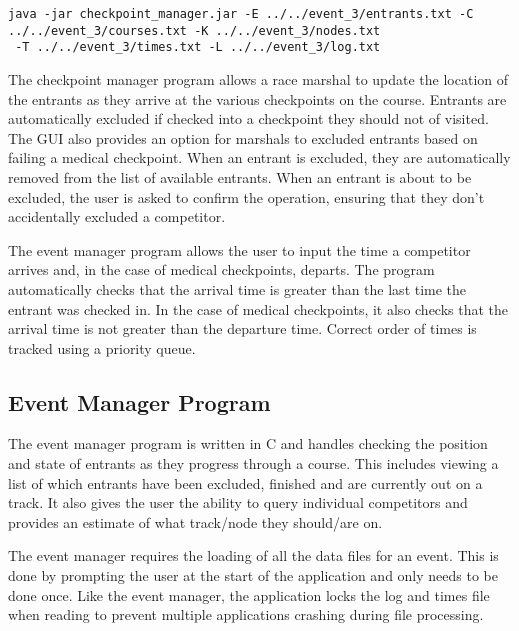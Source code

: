 \documentclass{article}
\begin{document}

\begin{center}
	\begin{lstlisting}[showstringspaces=false]
java -jar checkpoint_manager.jar -E ../../event_3/entrants.txt -C ../../event_3/courses.txt -K ../../event_3/nodes.txt
 -T ../../event_3/times.txt -L ../../event_3/log.txt

	\end{lstlisting}
\end{center}

The checkpoint manager program allows a race marshal to update the location of the entrants as they arrive at the various checkpoints on the course. Entrants are automatically excluded if checked into a checkpoint they should not of visited. The GUI also provides an option for marshals to excluded entrants based on failing a medical checkpoint. When an entrant is excluded, they are automatically removed from the list of available entrants. When an entrant is about to be excluded, the user is asked to confirm the operation, ensuring that they don't accidentally excluded a competitor.


The event manager program allows the user to input the time a competitor arrives and, in the case of medical checkpoints, departs. The program automatically checks that the arrival time is greater than the last time the entrant was checked in. In the case of medical checkpoints, it also checks that the arrival time is not greater than the departure time. Correct order of times is tracked using a priority queue.

\subsection{Event Manager Program}
The event manager program is written in C and handles checking the position and state of entrants as they progress through a course. This includes viewing a list of which entrants have been excluded, finished and are currently out on a track. It also gives the user the ability to query individual competitors and provides an estimate of what track/node they should/are on.

The event manager requires the loading of all the data files for an event. This is done by prompting the user at the start of the application and only needs to be done once. Like the event manager, the application locks the log and times file when reading to prevent multiple applications crashing during file processing.
\end{document}
